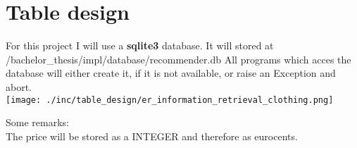 

\section{Table design}
For this project I will use a \textbf{sqlite3} database.
It will stored at /bachelor\_thesis/impl/database/recommender.db
All programs which acces the database will either create it, if it is not available, or raise an Exception and abort.\\

\bigskip
\texttt{[image: ./inc/table\_design/er\_information\_retrieval\_clothing.png]}

\bigskip
{}

\bigskip
Some remarks:\\
The price will be stored as a INTEGER and therefore as eurocents.\\



